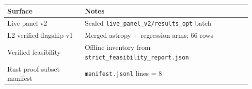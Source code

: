 \begin{tabular}{ll}
\hline
Surface & Notes \\
\hline
Live panel v2 & Sealed \texttt{live\_panel\_v2/results\_opt} batch \\
L2 verified flagship v1 & Merged astropy + regression arms; 66 rows \\
Verified feasibility & Offline inventory from \texttt{strict\_feasibility\_report.json} \\
Rust proof subset manifest & \texttt{manifest.jsonl} lines = 8 \\
\hline
\end{tabular}
